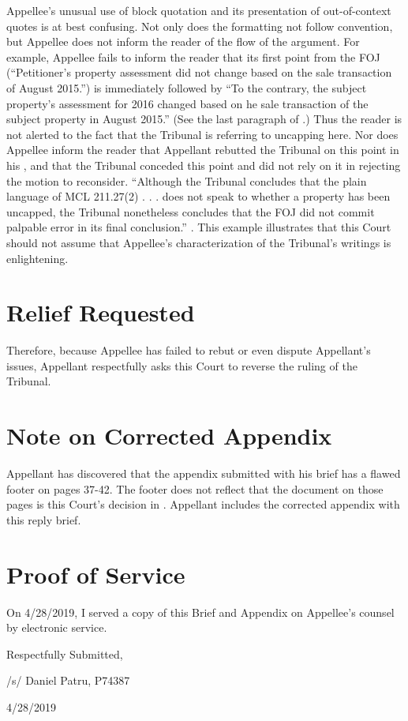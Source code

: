 \documentclass[12pt,\documentclassflag]{michiganCourtOfAppealsBrief}
\begin{document}
Appellee's unusual use of block quotation and its presentation of out-of-context quotes is at best confusing. Not only does the formatting not follow convention, but Appellee does not inform the reader of the flow of the argument. For example, Appellee fails to inform the reader that its first point from the FOJ (``Petitioner's property assessment did not change based on the sale transaction of August 2015.'') is immediately followed by ``To the contrary, the subject property's assessment for 2016 changed based on he sale transaction of the subject property in August 2015.'' (See the last paragraph of \foj[5].) Thus the reader is not alerted to the fact that the Tribunal is referring to uncapping here. Nor does Appellee inform the reader that Appellant rebutted the Tribunal on this point in his \motionForReconsideration[4], and that the Tribunal conceded this point and did not rely on it in rejecting the motion to reconsider. ``Although the Tribunal concludes that the plain language of MCL 211.27(2) . . . does not speak to whether a property has been uncapped, the Tribunal nonetheless concludes that the FOJ did not commit palpable error in its final conclusion.'' \reconsiderationDenied[1-2]. This example illustrates that this Court should not assume that Appellee's characterization of the Tribunal's writings is enlightening.

\section{Relief Requested}

Therefore, because Appellee has failed to rebut or even dispute Appellant's issues, Appellant respectfully asks this Court to reverse the ruling of the Tribunal.

\section{Note on Corrected Appendix}

Appellant has discovered that the appendix submitted with his brief has a flawed footer on pages 37-42. The footer does not reflect that the document on those pages is this Court's decision in \cite{Patru}. Appellant includes the corrected appendix with this reply brief.

\section{Proof of Service}

On 4/28/2019, I served a copy of this Brief and Appendix on Appellee's counsel by electronic service.

\vspace{1\baselineskip}

{ \setlength{\leftskip}{3.5in}

  Respectfully Submitted,

  /s/ Daniel Patru, P74387

  4/28/2019

  \setlength{\leftskip}{0pt}}

\newpage\empty%
\end{document}
